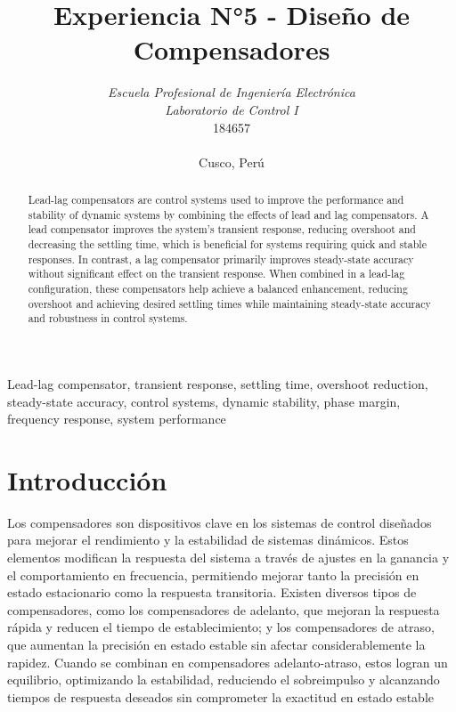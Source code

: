 \documentclass[conference]{IEEEtran}
\begin{document}
	
	\title{Experiencia N°5 - Diseño de Compensadores}
	\author{	
		\textit{Escuela Profesional de Ingeniería Electrónica}\\
		\textit{Laboratorio de Control I}\\
		184657 \\\\
		Cusco, Perú
	}
	
	\maketitle
	
	\begin{abstract}
		Lead-lag compensators are control systems used to improve the performance and stability of dynamic systems by combining the effects of lead and lag compensators. A lead compensator improves the system’s transient response, reducing overshoot and decreasing the settling time, which is beneficial for systems requiring quick and stable responses. In contrast, a lag compensator primarily improves steady-state accuracy without significant effect on the transient response. When combined in a lead-lag configuration, these compensators help achieve a balanced enhancement, reducing overshoot and achieving desired settling times while maintaining steady-state accuracy and robustness in control systems.
	\end{abstract}
	
	\begin{IEEEkeywords}
		Lead-lag compensator, transient response, settling time, overshoot reduction, steady-state accuracy, control systems, dynamic stability, phase margin, frequency response, system performance
	\end{IEEEkeywords}
	
	\section{Introducción}
	Los compensadores son dispositivos clave en los sistemas de control diseñados para mejorar el rendimiento y la estabilidad de sistemas dinámicos. Estos elementos modifican la respuesta del sistema a través de ajustes en la ganancia y el comportamiento en frecuencia, permitiendo mejorar tanto la precisión en estado estacionario como la respuesta transitoria. Existen diversos tipos de compensadores, como los compensadores de adelanto, que mejoran la respuesta rápida y reducen el tiempo de establecimiento; y los compensadores de atraso, que aumentan la precisión en estado estable sin afectar considerablemente la rapidez. Cuando se combinan en compensadores adelanto-atraso, estos logran un equilibrio, optimizando la estabilidad, reduciendo el sobreimpulso y alcanzando tiempos de respuesta deseados sin comprometer la exactitud en estado estable
	
\end{document}

